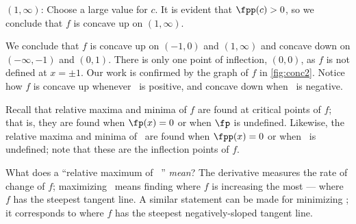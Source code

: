 \begin{example}
\begin{description}[leftmargin=0pt]
\item[Interval 4,] $(1,\infty)$: Choose a large value for $c$. It is evident that $\fpp(c)>0$, so we conclude that $f$ is concave up on $(1,\infty)$.
\end{description}


\begin{center}
\end{center}

We conclude that $f$ is concave up on $(-1,0)$ and $(1,\infty)$ and concave down on $(-\infty,-1)$ and $(0,1)$. There is only one point of inflection, $(0,0)$, as $f$ is not defined at $x=\pm 1$. Our work is confirmed by the graph of $f$ in \autoref{fig:conc2}. Notice how $f$ is concave up whenever \fpp\ is positive, and concave down when \fpp\ is negative.
\end{example}

Recall that relative maxima and minima of $f$ are found at critical points of $f$; that is, they are found when $\fp(x)=0$ or when $\fp$ is undefined. Likewise, the relative maxima and minima of \fp\ are found when $\fpp(x)=0$ or when \fpp\ is undefined; note that these are the inflection points of $f$. 

What does a ``relative maximum of \fp\ '' \emph{mean}? The derivative measures the rate of change of $f$; maximizing \fp\ means finding where $f$ is increasing the most --- where $f$ has the steepest tangent line. A similar statement can be made for minimizing \fp; it corresponds to where $f$ has the steepest negatively-sloped tangent line.

